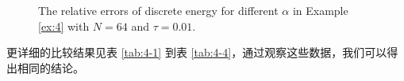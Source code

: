 \begin{figure}[H]
\begin{center}
  \caption{The relative errors of discrete energy for different $\alpha$ in Example \ref{ex:4} with $N = 64$ and $\tau=0.01$.} \label{fig:12}
\end{center}
\end{figure}

更详细的比较结果见表 \ref{tab:4-1} 到表 \ref{tab:4-4}，通过观察这些数据，我们可以得出相同的结论。


